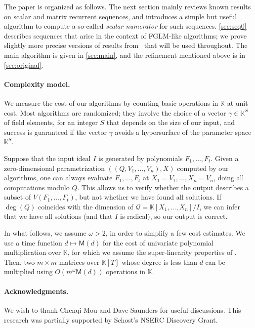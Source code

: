 \documentclass[12pt]{article}
\newcommand{\lf}{X}
\newcommand{\residueI}{\mathscr{Q}}
\newcommand{\sqfree}{Q}
\def\M {\ensuremath{\mathsf{M}}}
\def\K{\mathbb{K}}
\def\K {\ensuremath{\mathbb{K}}}
\begin{document}
The paper is organized as follows. The next section mainly reviews
known results on scalar and matrix recurrent sequences, and introduces
a simple but useful algorithm to compute a so-called {\em scalar
  numerator} for such sequences. \cref{sec:seq0} describes sequences
that arise in the context of FGLM-like algorithms; we prove slightly
more precise versions of results from~\cite{BoSaSc03} that will be 
used throughout. The main algorithm is given in \cref{sec:main},
and the refinement mentioned above is in \cref{sec:original}.


\paragraph{Complexity model.}
We measure the cost of our algorithms by counting basic operations in
$\K$ at unit cost. Most algorithms are randomized; they involve the
choice of a vector $\gamma \in \K^S$ of field elements, for an integer
$S$ that depends on the size of our input, and success is guaranteed
if the vector $\gamma$ avoids a hypersurface of the parameter space
$\K^S$.

Suppose that the input ideal $I$ is generated by polynomials
$F_1,\dots,F_t$.  Given a zero-dimensional parametrization
$((\sqfree,V_1,\dots,V_n),\lf)$ computed by our algorithms, one can
always evaluate $F_1,\dots,F_t$ at $X_1 =V_1,\dots,X_n=V_n$, doing all
computations modulo $\sqfree$. This allows us to verify whether the
output describes a subset of $V(F_1,\dots,F_t)$, but not whether we
have found all solutions.  If $\deg(Q)$ coincides with the dimension
of $\residueI=\K[X_1,\dots,X_n]/I$, we can infer that we have all
solutions (and that $I$ is radical), so our output is correct.

In what follows, we assume $\omega>2$, in order to simplify a few cost
estimates. We use a time function $d \mapsto \M(d)$ for the cost of
univariate polynomial multiplication over $\K$, for which we assume
the super-linearity properties of \cite[Section~8.4]{GaGe13}.  Then,
two $m\times m$ matrices over $\K[T]$ whose degree is less than $d$
can be multiplied using $O(m^\omega \M(d))$ operations in $\K$.


\paragraph{Acknowledgments.} We wish to thank Chenqi Mou and Dave Saunders for useful
discussions. This research was partially supported by Schost's NSERC
Discovery Grant.
\end{document}
